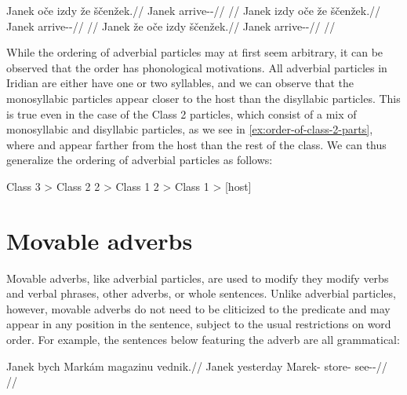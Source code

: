 \pex
\a\label{ex:oce-iz-gramm}
\begingl
	\gla Janek oče izdy že ščenžek.//
	\glb Janek \Mir{} \Infer{} \Pfv{} arrive-\Av{}-\Pf{}//
	\glft {}//
\endgl
\a\label{ex:iz-oce-gramm}
\begingl
	\gla Janek izdy oče že ščenžek.//
	\glb Janek \Infer{} \Mir{} \Pfv{} arrive-\Av{}-\Pf{}//
	\glft {}//
\endgl
\a\label{ex:oce-iz-ungramm}
\begingl
	\gla \ljudge{*}Janek že oče izdy ščenžek.//
	\glb Janek \Pfv{} \Mir{} \Infer{} arrive-\Av{}-\Pf{}//
	\glft {}//
\endgl
\xe

While the ordering of adverbial particles may at first seem arbitrary, it can be
observed that the order has phonological motivations. All adverbial particles in
Iridian are either have one or two syllables, and we can observe that the
monosyllabic particles appear closer to the host than the disyllabic particles.
This is true even in the case of the Class 2 particles, which consist of a mix
of monosyllabic and disyllabic particles, as we see in
\ref{ex:order-of-class-2-parts}, where  and  appear farther
from the host than the rest of the class. We can thus generalize the ordering of
adverbial particles as follows:

\pex
	{\small
		Class 3 > Class 2 2\sigma{} > Class 1 2\sigma{} > Class 1 > [{\sc host}]
	}
\xe

\section{Movable adverbs}
\label{sec:movable-adverbs}

Movable adverbs, like adverbial particles, are used to modify they modify verbs
and verbal phrases, other adverbs, or whole sentences. Unlike adverbial
particles, however, movable adverbs do not need to be cliticized to the
predicate and may appear in any position in the sentence, subject to the usual
restrictions on word order. For example, the sentences below featuring the
adverb  are all grammatical:

\pex
\a
	\begingl
	\gla Janek bych Markám magazinu vednik.//
	\glb Janek yesterday Marek-\Agt{} store-\Ins{} see-\Pv{}-\Pf{}//
	\glft {}//
	\endgl
\a {}
\a {}
\a {}
\xe

